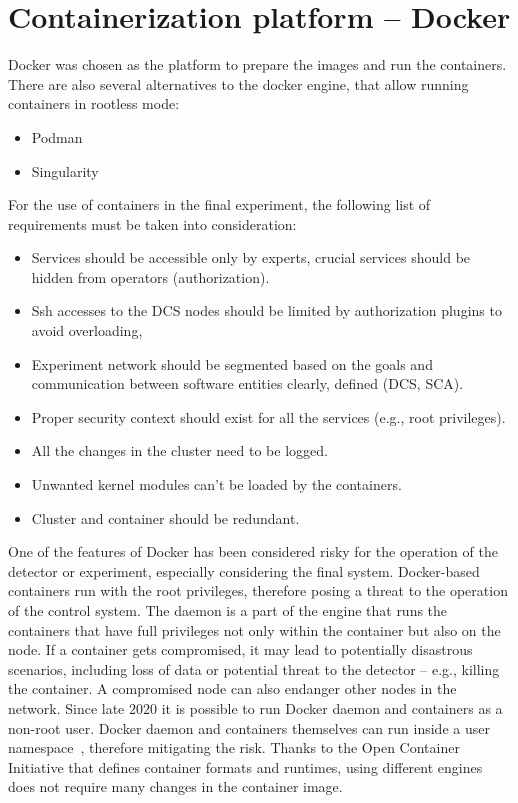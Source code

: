 \section{Containerization platform -- Docker}
Docker was chosen as the platform to prepare the images and run the containers. There are also several alternatives to the docker engine, that allow running containers in rootless mode:
\begin{itemize}
    \item Podman~\cite{Podman} 
    \item Singularity~\cite{singularity}
\end{itemize}

For the use of containers in the final experiment, the following list of requirements must be taken into consideration:

\begin{itemize}
    \item Services should be accessible only by experts, crucial services should be hidden from operators (authorization).
    \item Ssh accesses to the DCS nodes should be limited by authorization plugins to avoid overloading,
    \item Experiment network should be segmented based on the goals and communication between software entities clearly, defined (\gls{DCS}, \gls{SCA}).
    \item Proper security context should exist for all the services (e.g., root privileges).
    \item All the changes in the cluster need to be logged.
    \item Unwanted kernel modules can't be loaded by the containers.
    \item Cluster and container should be redundant.
\end{itemize}


One of the features of Docker has been considered risky for the operation of the detector or experiment, especially considering the final system. Docker-based containers run with the root privileges, therefore posing a threat to the operation of the control system. The daemon is a part of the engine that runs the containers that have full privileges not only within the container but also on the node. If a container gets compromised, it may lead to potentially disastrous scenarios, including loss of data or potential threat to the detector -- e.g., killing the container. A compromised node can also endanger other nodes in the network.  Since late $2020$ it is possible to run Docker daemon and containers as a non-root user. Docker daemon and containers themselves can run inside a user namespace~\cite{docker_limitations}, therefore mitigating the risk.
 Thanks to the Open Container Initiative that defines container formats and runtimes, using different engines does not require many changes in the container image. 

